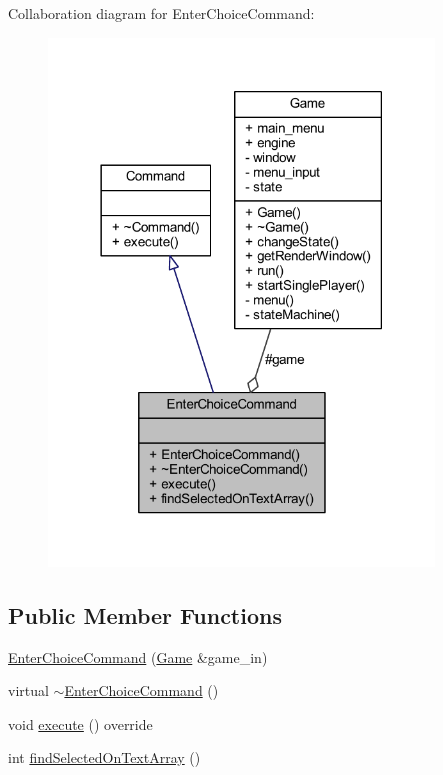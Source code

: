Collaboration diagram for Enter\+Choice\+Command\+:\nopagebreak
\begin{figure}[H]
\begin{center}
\leavevmode
\includegraphics[width=290pt]{class_enter_choice_command__coll__graph}
\end{center}
\end{figure}
\subsection*{Public Member Functions}
\begin{DoxyCompactItemize}
\item 
\hyperlink{class_enter_choice_command_ab28cfc3f238985775ec33ebb33c355a6}{Enter\+Choice\+Command} (\hyperlink{class_game}{Game} \&game\+\_\+in)
\item 
virtual \hyperlink{class_enter_choice_command_aa7a330dcd6ffcf6f806c26b577bba21c}{$\sim$\+Enter\+Choice\+Command} ()
\item 
void \hyperlink{class_enter_choice_command_a684f65bfc296353ecefc6edc1c678c70}{execute} () override
\item 
int \hyperlink{class_enter_choice_command_a09b35eafcb1ba6d9e6fb93425702e6c4}{find\+Selected\+On\+Text\+Array} ()
\end{DoxyCompactItemize}
